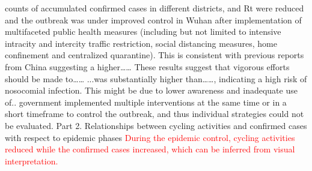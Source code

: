 \documentclass[preprints,ijgi,submit,moreauthors]{Definitions/mdpi}
\begin{document}
counts of accumulated confirmed cases in different districts, and Rt were reduced and the outbreak was under improved control in Wuhan after implementation of multifaceted public health measures (including but not limited to intensive intracity and intercity traffic restriction, social distancing measures, home confinement and centralized quarantine).
This is consistent with previous reports from China suggesting a higher……
These results suggest that vigorous efforts should be made to……
...was substantially higher than……,  indicating a high risk of nosocomial infection. This might be due to lower awareness and inadequate use of..
government implemented multiple interventions at the same time or in a short timeframe to control the outbreak, and thus individual strategies could not be evaluated.
Part 2. Relationships between cycling activities and confirmed cases with respect to epidemic phases
\textcolor{red}{During the epidemic control, cycling activities reduced while the confirmed cases increased, which can be inferred from visual interpretation.}
\end{document}
